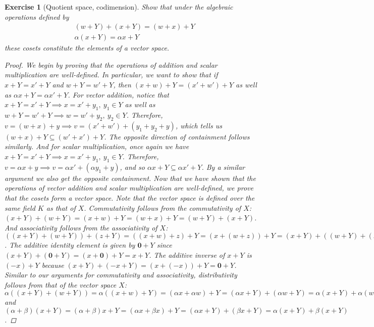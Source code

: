 \documentclass[11pt]{article}
\theoremstyle{mystyle}
\newtheorem{protoexer}{Exercise}[section]
\newenvironment{exer}
{\colorlet{shadecolor}{blue!15}\begin{shaded}\begin{protoexer}}
{\end{protoexer}\end{shaded}}
\newcommand{\0}{\mathbf{0}}
\begin{document}
\begin{exer}[Quotient space, codimension]
Show that under the algebraic operations defined by
\begin{align*}
    &(w + Y) + (x + Y) = (w + x) + Y\\
    &\alpha(x + Y) = \alpha x + Y
\end{align*}
these cosets constitute the elements of a vector space.
\begin{proof}
    We begin by proving that the operations of addition and scalar multiplication are well-defined. In particular, we want to show that if $x + Y = x' + Y$ and $w + Y = w' + Y$, then $(x + w) + Y = (x' + w') + Y$ as well as $\alpha x + Y = \alpha x' + Y$.\newline
    For vector addition, notice that $x + Y = x' + Y \implies x = x' + y_1, \ y_1 \in Y$ as well as $w + Y = w' + Y \implies w = w' + y_2, \ y_2 \in Y$. Therefore, $v = (w + x) + y \implies  v = (x' + w') + (y_1 + y_2 + y)$, which tells us $(w + x) + Y \subseteq (w' + x') + Y$. The opposite direction of containment follows similarly.\newline
    And for scalar multiplication, once again we have  $x + Y = x' + Y \implies x = x' + y_1, \ y_1 \in Y$. Therefore, $v = \alpha x + y \implies v = \alpha x' + (\alpha y_1 + y)$, and so $\alpha x + Y \subseteq \alpha x' + Y$. By a similar argument we also get the opposite containment.\newline
    Now that we have shown that the operations of vector addition and scalar multiplication are well-defined, we prove that the cosets form a vector space. Note that the vector space is defined over the same field $K$ as that of $X$. \newline
    Commutativity follows from the commutativity of $X$: $(x + Y) + (w + Y) = (x + w) + Y = (w + x) + Y = (w + Y) + (x + Y)$. And associativity follows from the associativity of $X$: $((x + Y) + (w + Y)) + (z + Y) = ((x + w) + z) + Y = (x +( w + z)) + Y = (x + Y) + ((w + Y) + (z + Y))$.\newline
    The additive identity element is given by $\0 + Y$ since $(x + Y) + (\0 + Y) = (x + \0) + Y = x + Y$. The additive inverse of $x + Y$ is $(-x) + Y$ because $(x + Y) + (-x + Y) = (x + (-x)) + Y = \0 + Y$.\newline
    Similar to our arguments for commutativity and associativity, distributivity follows from that of the vector space $X$: $\alpha( (x + Y) + (w + Y)) = \alpha ((x + w) + Y) = (\alpha x + \alpha w) + Y = (\alpha x + Y) + (\alpha w + Y) = \alpha(x + Y) + \alpha (w + Y)$ and $(\alpha + \beta)(x + Y) = (\alpha + \beta)x + Y = (\alpha x + \beta x) + Y = (\alpha x + Y) + (\beta x + Y) = \alpha(x + Y) + \beta (x + Y)$.\newline

\end{proof}
\end{exer}
\end{document}
